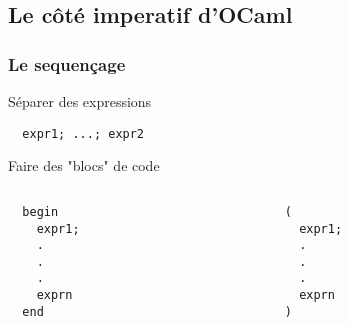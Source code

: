 \subsection{Le côté imperatif d'OCaml} %

\begin{frame}[fragile]
	\frametitle{Le sequençage}
		\begin{block}{Séparer des expressions}
			\begin{lstlisting}
  expr1; ...; expr2
			\end{lstlisting}
		\end{block}
		\begin{block}{Faire des "blocs" de code}
			\begin{columns}
				\begin{column}{3cm}
					\begin{lstlisting}
  begin
    expr1; 
    .
    .
    .
    exprn
  end
					\end{lstlisting}
				\end{column}
				\begin{column}{7cm}
					\begin{lstlisting}
  ( 
    expr1; 
    .
    .
    .
    exprn
  )
					\end{lstlisting}
				\end{column}
			\end{columns}
		\end{block}
\end{frame}

